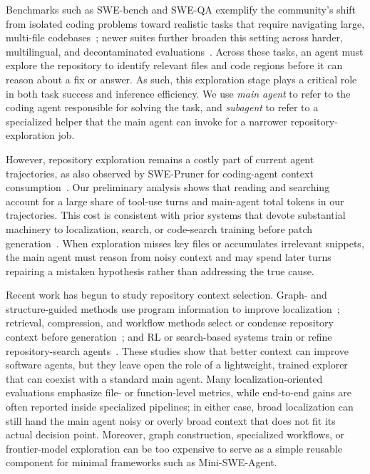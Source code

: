 \documentclass[11pt]{article}
\begin{document}
Benchmarks such as SWE-bench and SWE-QA exemplify the community's shift from isolated coding problems toward realistic tasks that require navigating large, multi-file codebases~\cite{swebench, sweqa}; newer suites further broaden this setting across harder, multilingual, and decontaminated evaluations~\cite{swebenchpro, rebench}.
Across these tasks, an agent must explore the repository to identify relevant files and code regions before it can reason about a fix or answer.
As such, this exploration stage plays a critical role in both task success and inference efficiency.
We use \emph{main agent} to refer to the coding agent responsible for solving the task, and \emph{subagent} to refer to a specialized helper that the main agent can invoke for a narrower repository-exploration job.



However, repository exploration remains a costly part of current agent trajectories, as also observed by SWE-Pruner for coding-agent context consumption~\cite{swepruner}.
Our preliminary analysis shows that reading and searching account for a large share of tool-use turns and main-agent total tokens in our trajectories.
This cost is consistent with prior systems that devote substantial machinery to localization, search, or code-search training before patch generation~\cite{autocoderover, agentless, codescout}.
When exploration misses key files or accumulates irrelevant snippets, the main agent must reason from noisy context and may spend later turns repairing a mistaken hypothesis rather than addressing the true cause.


Recent work has begun to study repository context selection.
Graph- and structure-guided methods use program information to improve localization~\cite{autocoderover, locagent, cosil, cgm}; retrieval, compression, and workflow methods select or condense repository context before generation~\cite{repocoder, longcodezip, codeocr, agentless}; and RL or search-based systems train or refine repository-search agents~\cite{codescout, swegrep}.
These studies show that better context can improve software agents, but they leave open the role of a lightweight, trained explorer that can coexist with a standard main agent.
Many localization-oriented evaluations emphasize file- or function-level metrics, while end-to-end gains are often reported inside specialized pipelines; in either case, broad localization can still hand the main agent noisy or overly broad context that does not fit its actual decision point.
Moreover, graph construction, specialized workflows, or frontier-model exploration can be too expensive to serve as a simple reusable component for minimal frameworks such as Mini-SWE-Agent.
\end{document}
